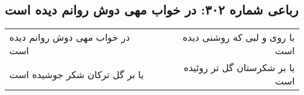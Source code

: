 \begin{center}
\section*{رباعی شماره ۳۰۲: در خواب مهی دوش روانم دیده است}
\label{sec:0302}
\begin{longtable}{l p{0.5cm} r}
در خواب مهی دوش روانم دیده است
&&
با روی و لبی که روشنی دیده است
\\
یا بر گل ترکان شکر جوشیده است
&&
یا بر شکرستان گل تر روئیده است
\\
\end{longtable}
\end{center}
